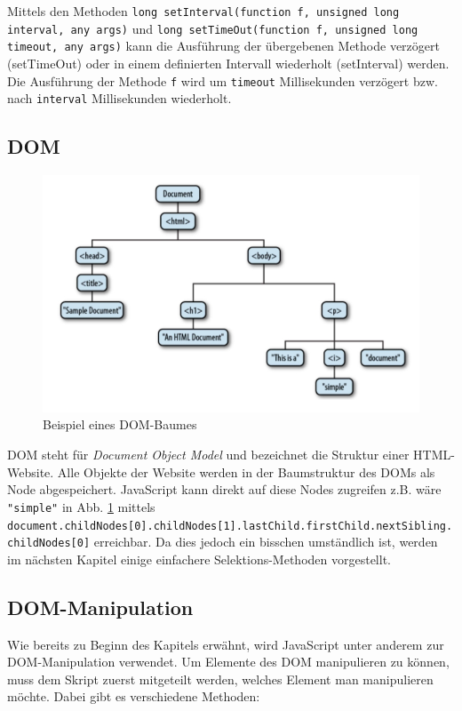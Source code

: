 \documentclass[a4paper, 11pt]{article}
\newcommand{\code}[1]{\texttt{#1}}
\begin{document}
Mittels den Methoden \code{long setInterval(function f, unsigned long interval, any args)} und \code{long setTimeOut(function f, unsigned long timeout, any args)} kann die Ausführung der übergebenen Methode verzögert (setTimeOut) oder in einem definierten Intervall wiederholt (setInterval) werden. Die Ausführung der Methode \code{f} wird um \code{timeout} Millisekunden verzögert bzw. nach \code{interval} Millisekunden wiederholt.

\subsection{DOM}
\begin{figure}[htb]
	\centering
	\includegraphics[keepaspectratio=true,height=14\baselineskip]{DOM_structure.jpg}
	\caption{Beispiel eines DOM-Baumes}
	\label{fig:DOM}
\end{figure}
DOM steht für \textit{Document Object Model} und bezeichnet die Struktur einer HTML-Website. Alle Objekte der Website werden in der Baumstruktur des DOMs als Node abgespeichert. JavaScript kann direkt auf diese Nodes zugreifen z.B. wäre \code{"simple"} in Abb. \ref{fig:DOM} mittels \code{document.childNodes[0].childNodes[1].lastChild.firstChild.nextSibling.childNodes[0]} erreichbar. Da dies jedoch ein bisschen umständlich ist, werden im nächsten Kapitel einige einfachere Selektions-Methoden vorgestellt.


\subsection{DOM-Manipulation}
Wie bereits zu Beginn des Kapitels erwähnt, wird JavaScript unter anderem zur DOM-Manipulation verwendet. Um Elemente des DOM manipulieren zu können, muss dem Skript zuerst mitgeteilt werden, welches Element man manipulieren möchte. Dabei gibt es verschiedene Methoden:
\end{document}
